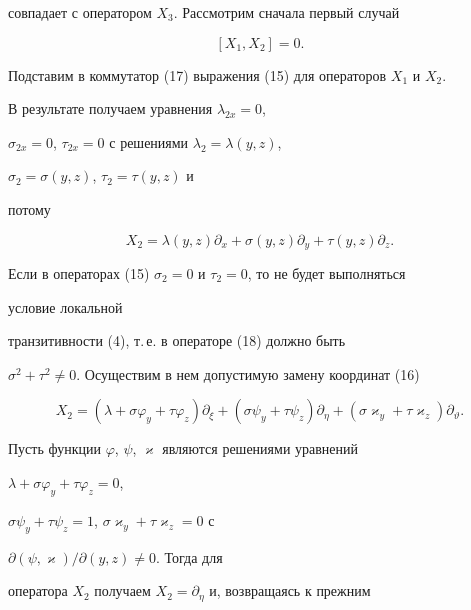совпадает с оператором $X_3$. Рассмотрим сначала первый случай


\begin{equation} 


[X_1,X_2]=0. 


\end{equation} 


Подставим в коммутатор (17) выражения (15) для операторов $X_1$ и $X_2$. 


В результате получаем уравнения $\lambda_{2x}=0$, 


$\sigma_{2x}=0$, $\tau_{2x}=0$ с решениями $\lambda_2=\lambda(y,z)$, 


$\sigma_2=\sigma(y,z)$, $\tau_2=\tau(y,z)$ и 


потому 


\begin{equation} 


X_2=\lambda(y,z)\partial_x+\sigma(y,z)\partial_y+ 


\tau(y,z)\partial_z. 


\end{equation} 


 


Если в операторах (15) $\sigma_2=0$ и $\tau_2=0$, то не будет выполняться 


условие локальной 


транзитивности (4), т.\,е. в операторе (18) должно быть 


$\sigma^2+\tau^2\ne 0$. Осуществим в нем допустимую замену координат (16)


$$ 


X_2=(\lambda+\sigma\varphi_y+\tau\varphi_z)\partial_\xi+ 


(\sigma\psi_y+\tau\psi_z)\partial_\eta+ 


(\sigma\varkappa_y+\tau\varkappa_z)\partial_\vartheta. 


$$ 


 


Пусть функции $\varphi$, $\psi$, $\varkappa$ являются решениями уравнений 


$\lambda+\sigma\varphi_y+\tau\varphi_z=0$, 


$\sigma\psi_y+\tau\psi_z=1$, $\sigma\varkappa_y+\tau\varkappa_z=0$ с 


$\partial(\psi,\varkappa)/\partial(y,z)\ne 0$. Тогда для 


оператора $X_2$ получаем $X_2=\partial_\eta$ и, возвращаясь к прежним 


